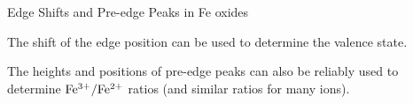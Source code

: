 \begin{slide}{Edge Shifts and Pre-edge Peaks in Fe oxides}

  \begin{center}
    \begin{minipage}{30mm} {}      \end{minipage}

    \vspace{2mm}

    \begin{minipage}{105mm} \setlength{\baselineskip}{10pt}
      {}  The shift of the edge
      position can be used to determine the valence state.

      \vspace{2mm}

      The heights and positions of pre-edge peaks can also be reliably
      used to determine ${\rm Fe^{3+}/Fe^{2+} }$ ratios (and
      similar ratios for many ions).
    \end{minipage}
  \end{center}
  \vmm

\vfill
\end{slide}
